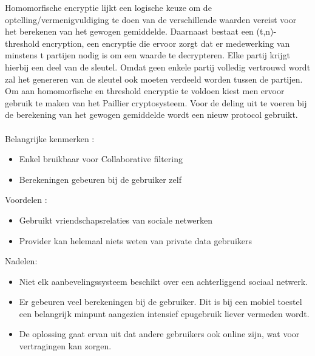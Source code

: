 Homomorfische encryptie lijkt een logische keuze om de optelling/vermenigvuldiging te doen van de verschillende waarden vereist voor het berekenen van het gewogen gemiddelde. Daarnaast bestaat een (t,n)-threshold encryption, een encryptie die ervoor zorgt dat er medewerking van minstens t partijen nodig is om een waarde te decrypteren. Elke partij krijgt hierbij een deel van de sleutel. Omdat geen enkele partij volledig vertrouwd wordt zal het genereren van de sleutel ook moeten verdeeld worden tussen de partijen. Om aan homomorfische en threshold encryptie te voldoen kiest men ervoor gebruik te maken van het Paillier cryptosysteem. Voor de deling uit te voeren  bij de berekening van het gewogen gemiddelde wordt een nieuw protocol gebruikt.\\\\
Belangrijke kenmerken :
\begin{itemize}
 
\item Enkel bruikbaar voor Collaborative filtering
\item Berekeningen gebeuren bij de gebruiker zelf
\end{itemize}
Voordelen : 
\begin{itemize}
\item Gebruikt vriendschapsrelaties van sociale netwerken
\item Provider kan helemaal niets weten van private data gebruikers
\end{itemize}
Nadelen:
\begin{itemize}
\item Niet elk aanbevelingssysteem beschikt over een achterliggend sociaal netwerk.
\item Er gebeuren veel berekeningen bij de gebruiker. Dit is bij een mobiel toestel een belangrijk minpunt aangezien intensief cpugebruik liever vermeden wordt.
\item De oplossing gaat ervan uit dat andere gebruikers ook online zijn, wat voor vertragingen kan zorgen.
\end{itemize}


